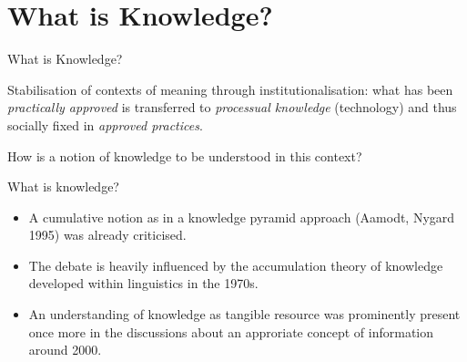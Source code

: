 \documentclass{beamer}
\begin{document}
\section{What is Knowledge?}
\begin{frame}{What is Knowledge?}
  
Stabilisation of contexts of meaning through institutionalisation: what has
been \emph{practically approved} is transferred to \emph{processual knowledge}
(technology) and thus socially fixed in \emph{approved practices}.

How is a notion of knowledge to be understood in this context?

What is knowledge?

\begin{itemize}
\item A cumulative notion as in a knowledge pyramid approach (Aamodt, Nygard
  1995) was already criticised.
\item The debate is heavily influenced by the accumulation theory of knowledge
  developed within linguistics in the 1970s.
\item An understanding of knowledge as tangible resource was prominently
  present once more in the discussions about an approriate concept of
  information around 2000.
\end{itemize}
\end{frame}
\end{document}

